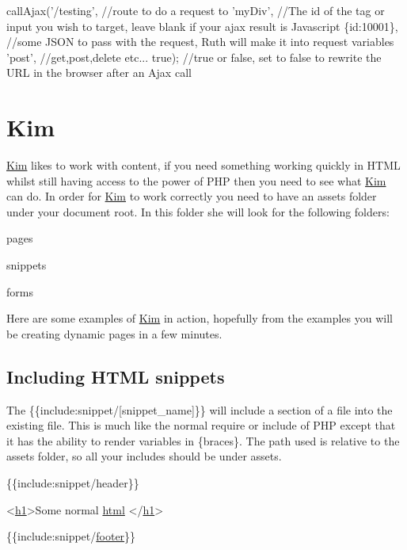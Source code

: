 \begin{DoxyCode}
callAjax(\textcolor{stringliteral}{'/testing'}, \textcolor{comment}{//route to do a request to}
         \textcolor{stringliteral}{'myDiv'}, \textcolor{comment}{//The id of the tag or input you wish to target, leave blank if your ajax result is
       Javascript}
         \{\textcolor{keywordtype}{id}:10001\}, \textcolor{comment}{//some JSON to pass with the request, Ruth will make it into request variables}
         \textcolor{stringliteral}{'post'}, \textcolor{comment}{//get,post,delete etc...}
         \textcolor{keyword}{true}); \textcolor{comment}{//true or false, set to false to rewrite the URL in the browser after an Ajax call}
\end{DoxyCode}
\hypertarget{index_kim}{}\section{Kim}\label{index_kim}


\hyperlink{classKim}{Kim} likes to work with content, if you need something working quickly in H\+T\+M\+L whilst still having access to the power of P\+H\+P then you need to see what \hyperlink{classKim}{Kim} can do. In order for \hyperlink{classKim}{Kim} to work correctly you need to have an assets folder under your document root. In this folder she will look for the following folders\+:


\begin{DoxyItemize}
\item pages 
\item snippets 
\item forms 
\end{DoxyItemize}

Here are some examples of \hyperlink{classKim}{Kim} in action, hopefully from the examples you will be creating dynamic pages in a few minutes.\hypertarget{index_kim_include}{}\subsection{Including H\+T\+M\+L snippets}\label{index_kim_include}
The \{\{include\+:snippet/\mbox{[}snippet\+\_\+name\mbox{]}\}\} will include a section of a file into the existing file. This is much like the normal require or include of P\+H\+P except that it has the ability to render variables in \{braces\}. The path used is relative to the assets folder, so all your includes should be under assets.


\begin{DoxyCode}
\{\{include:snippet/header\}\}

<\hyperlink{Shape_8php_a92ed2229ea45cf3c0e84a02cf12a7533}{h1}>Some normal \hyperlink{Shape_8php_a8b267aa0adca2018097f6f6f4c804d46}{html} </\hyperlink{Shape_8php_a92ed2229ea45cf3c0e84a02cf12a7533}{h1}>

\{\{include:snippet/\hyperlink{Shape_8php_ae5058e5b790e8cea2dd33c1c9bbcbbd4}{footer}\}\}
\end{DoxyCode}


